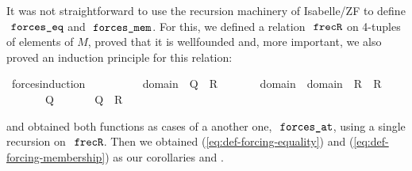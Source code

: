 It was not straightforward to use the recursion machinery of
Isabelle/ZF to define $\forceseq$ and $\forcesmem$. For this, we
defined a relation $\frecR$ on 4-tuples of elements of $M$, proved
that it is wellfounded and, more important, we also proved an
induction principle for this relation:
%
\begin{isabelle}
\isamarkupfalse%
\ forces{\isacharunderscore}induction{\isacharcolon}\isanewline
\ \ \isanewline
\ \ \ \ {\isachardoublequoteopen}{\isasymAnd}{\isasymtau}\ {\isasymtheta}{\isachardot}\ {\isasymlbrakk}{\isasymAnd}{\isasymsigma}{\isachardot}\ {\isasymsigma}{\isasymin}domain{\isacharparenleft}{\isasymtheta}{\isacharparenright}\ {\isasymLongrightarrow}\ Q{\isacharparenleft}{\isasymtau}{\isacharcomma}{\isasymsigma}{\isacharparenright}{\isasymrbrakk}\ {\isasymLongrightarrow}\ R{\isacharparenleft}{\isasymtau}{\isacharcomma}{\isasymtheta}{\isacharparenright}{\isachardoublequoteclose}\footnotemark\isanewline
\ \ \ \ {\isachardoublequoteopen}{\isasymAnd}{\isasymtau}\ {\isasymtheta}{\isachardot}\ {\isasymlbrakk}{\isasymAnd}{\isasymsigma}{\isachardot}\ {\isasymsigma}{\isasymin}domain{\isacharparenleft}{\isasymtau}{\isacharparenright}\ {\isasymunion}\ domain{\isacharparenleft}{\isasymtheta}{\isacharparenright}\ {\isasymLongrightarrow}\ R{\isacharparenleft}{\isasymsigma}{\isacharcomma}{\isasymtau}{\isacharparenright}\ {\isasymand}\ R{\isacharparenleft}{\isasymsigma}{\isacharcomma}{\isasymtheta}{\isacharparenright}{\isasymrbrakk}\isanewline
\ \ \ \ \ \  {\isasymLongrightarrow}\ Q{\isacharparenleft}{\isasymtau}{\isacharcomma}{\isasymtheta}{\isacharparenright}{\isachardoublequoteclose}\isanewline
\ \ \isanewline
\ \ \ \ {\isachardoublequoteopen}Q{\isacharparenleft}{\isasymtau}{\isacharcomma}{\isasymtheta}{\isacharparenright}\ {\isasymand}\ R{\isacharparenleft}{\isasymtau}{\isacharcomma}{\isasymtheta}{\isacharparenright}{\isachardoublequoteclose}
\end{isabelle}
%
and 
obtained both functions as cases of a another one, 
$\forcesat$, using a single recursion on $\frecR$. Then we obtained 
(\ref{eq:def-forcing-equality}) and (\ref{eq:def-forcing-membership})
as our corollaries  and
.

